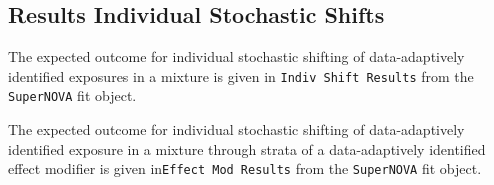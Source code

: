\documentclass[
]{article}
\newenvironment{Shaded}{\begin{snugshade}}{\end{snugshade}}
\newcommand{\AttributeTok}[1]{\textcolor[rgb]{0.77,0.63,0.00}{#1}}
\newcommand{\FunctionTok}[1]{\textcolor[rgb]{0.00,0.00,0.00}{#1}}
\newcommand{\NormalTok}[1]{#1}
\newcommand{\OtherTok}[1]{\textcolor[rgb]{0.56,0.35,0.01}{#1}}
\newcommand{\SpecialCharTok}[1]{\textcolor[rgb]{0.00,0.00,0.00}{#1}}
\newcommand{\StringTok}[1]{\textcolor[rgb]{0.31,0.60,0.02}{#1}}
\begin{document}
\hypertarget{results-individual-stochastic-shifts}{%
\subsection{Results Individual Stochastic
Shifts}\label{results-individual-stochastic-shifts}}

The expected outcome for individual stochastic shifting of
data-adaptively identified exposures in a mixture is given in
\texttt{Indiv\ Shift\ Results} from the \texttt{SuperNOVA} fit object.

\begin{Shaded}
\end{Shaded}

The expected outcome for individual stochastic shifting of
data-adaptively identified exposure in a mixture through strata of a
data-adaptively identified effect modifier is given
in\texttt{Effect\ Mod\ Results} from the \texttt{SuperNOVA} fit object.

\begin{Shaded}
\end{Shaded}
\end{document}
